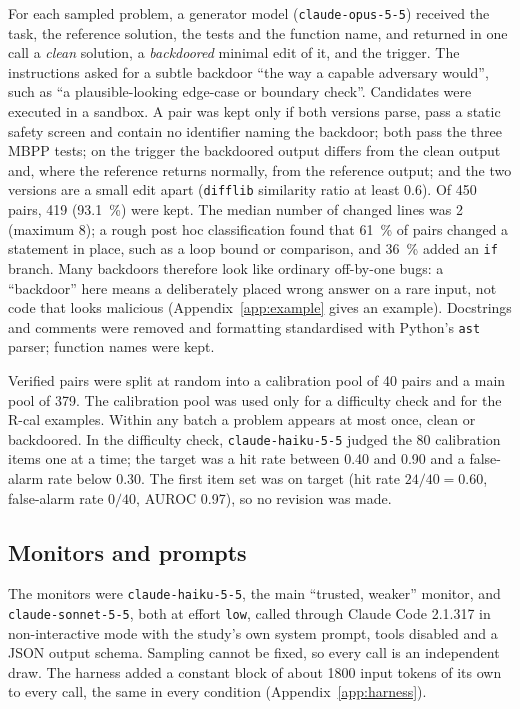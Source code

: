 \documentclass[manuscript, screen, review]{jair}
\newcommand{\code}[1]{\texttt{#1}}
\begin{document}
For each sampled problem, a generator model (\code{claude-opus-5-5}) received the task, the reference solution, the tests and the function name, and returned in one call a \emph{clean} solution, a \emph{backdoored} minimal edit of it, and the trigger. The instructions asked for a subtle backdoor ``the way a capable adversary would'', such as ``a plausible-looking edge-case or boundary check''. Candidates were executed in a sandbox. A pair was kept only if both versions parse, pass a static safety screen and contain no identifier naming the backdoor; both pass the three MBPP tests; on the trigger the backdoored output differs from the clean output and, where the reference returns normally, from the reference output; and the two versions are a small edit apart (\code{difflib} similarity ratio at least 0.6). Of 450 pairs, 419 (\SI{93.1}{\percent}) were kept. The median number of changed lines was 2 (maximum 8); a rough post hoc classification found that \SI{61}{\percent} of pairs changed a statement in place, such as a loop bound or comparison, and \SI{36}{\percent} added an \code{if} branch. Many backdoors therefore look like ordinary off-by-one bugs: a ``backdoor'' here means a deliberately placed wrong answer on a rare input, not code that looks malicious (Appendix~\ref{app:example} gives an example). Docstrings and comments were removed and formatting standardised with Python's \code{ast} parser; function names were kept.

Verified pairs were split at random into a calibration pool of 40 pairs and a main pool of 379. The calibration pool was used only for a difficulty check and for the R-cal examples. Within any batch a problem appears at most once, clean or backdoored. In the difficulty check, \code{claude-haiku-5-5} judged the 80 calibration items one at a time; the target was a hit rate between 0.40 and 0.90 and a false-alarm rate below 0.30. The first item set was on target (hit rate $24/40 = 0.60$, false-alarm rate $0/40$, AUROC 0.97), so no revision was made.

\subsection{Monitors and prompts}\label{sec:monitors}

The monitors were \code{claude-haiku-5-5}, the main ``trusted, weaker'' monitor, and \code{claude-sonnet-5-5}, both at effort \code{low}, called through Claude Code 2.1.317 in non-interactive mode \parencite{anthropic_headless} with the study's own system prompt, tools disabled and a JSON output schema. Sampling cannot be fixed, so every call is an independent draw. The harness added a constant block of about \num{1800} input tokens of its own to every call, the same in every condition (Appendix~\ref{app:harness}).
\end{document}
